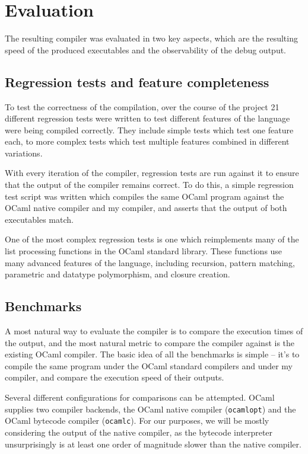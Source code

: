 \documentclass[12pt,a4paper,twoside,openright]{report}
\begin{document}
\chapter{Evaluation}

The resulting compiler was evaluated in two key aspects, which are the 
resulting speed of the produced executables and the observability of the debug 
output.

\section{Regression tests and feature completeness}

To test the correctness of the compilation, over the course of the project 21 
different regression tests were written to test different features of the 
language were being compiled correctly. They include simple tests which test 
one feature each, to more complex tests which test multiple features combined 
in different variations.

With every iteration of the compiler, regression tests are run against it to 
ensure that the output of the compiler remains correct. To do this, a simple 
regression test script was written which compiles the same OCaml program 
against the OCaml native compiler and my compiler, and asserts that the output 
of both executables match.

One of the most complex regression tests is one which reimplements many of the 
list processing functions in the OCaml standard library. These functions use 
many advanced features of the language, including recursion, pattern matching, 
parametric and datatype polymorphism, and closure creation.

\section{Benchmarks}

A most natural way to evaluate the compiler is to compare the execution times 
of the output, and the most natural metric to compare the compiler against is 
the existing OCaml compiler. The basic idea of all the benchmarks is simple -- 
it's to compile the same program under the OCaml standard compilers and under 
my compiler, and compare the execution speed of their outputs.

Several different configurations for comparisons can be attempted. OCaml 
supplies two compiler backends, the OCaml native compiler (\texttt{ocamlopt}) 
and the OCaml bytecode compiler (\texttt{ocamlc}). For our purposes, we will be 
mostly considering the output of the native compiler, as the bytecode 
interpreter unsurprisingly is at least one order of magnitude slower than the 
native compiler.
\end{document}
